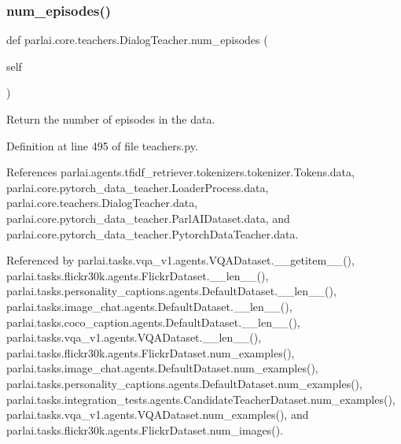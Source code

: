 \subsubsection{\texorpdfstring{num\+\_\+episodes()}{num\_episodes()}}
{\footnotesize\ttfamily def parlai.\+core.\+teachers.\+Dialog\+Teacher.\+num\+\_\+episodes (\begin{DoxyParamCaption}\item[{}]{self }\end{DoxyParamCaption})}

\begin{DoxyVerb}Return the number of episodes in the data.\end{DoxyVerb}
 

Definition at line 495 of file teachers.\+py.



References parlai.\+agents.\+tfidf\+\_\+retriever.\+tokenizers.\+tokenizer.\+Tokens.\+data, parlai.\+core.\+pytorch\+\_\+data\+\_\+teacher.\+Loader\+Process.\+data, parlai.\+core.\+teachers.\+Dialog\+Teacher.\+data, parlai.\+core.\+pytorch\+\_\+data\+\_\+teacher.\+Parl\+A\+I\+Dataset.\+data, and parlai.\+core.\+pytorch\+\_\+data\+\_\+teacher.\+Pytorch\+Data\+Teacher.\+data.



Referenced by parlai.\+tasks.\+vqa\+\_\+v1.\+agents.\+V\+Q\+A\+Dataset.\+\_\+\+\_\+getitem\+\_\+\+\_\+(), parlai.\+tasks.\+flickr30k.\+agents.\+Flickr\+Dataset.\+\_\+\+\_\+len\+\_\+\+\_\+(), parlai.\+tasks.\+personality\+\_\+captions.\+agents.\+Default\+Dataset.\+\_\+\+\_\+len\+\_\+\+\_\+(), parlai.\+tasks.\+image\+\_\+chat.\+agents.\+Default\+Dataset.\+\_\+\+\_\+len\+\_\+\+\_\+(), parlai.\+tasks.\+coco\+\_\+caption.\+agents.\+Default\+Dataset.\+\_\+\+\_\+len\+\_\+\+\_\+(), parlai.\+tasks.\+vqa\+\_\+v1.\+agents.\+V\+Q\+A\+Dataset.\+\_\+\+\_\+len\+\_\+\+\_\+(), parlai.\+tasks.\+flickr30k.\+agents.\+Flickr\+Dataset.\+num\+\_\+examples(), parlai.\+tasks.\+image\+\_\+chat.\+agents.\+Default\+Dataset.\+num\+\_\+examples(), parlai.\+tasks.\+personality\+\_\+captions.\+agents.\+Default\+Dataset.\+num\+\_\+examples(), parlai.\+tasks.\+integration\+\_\+tests.\+agents.\+Candidate\+Teacher\+Dataset.\+num\+\_\+examples(), parlai.\+tasks.\+vqa\+\_\+v1.\+agents.\+V\+Q\+A\+Dataset.\+num\+\_\+examples(), and parlai.\+tasks.\+flickr30k.\+agents.\+Flickr\+Dataset.\+num\+\_\+images().

